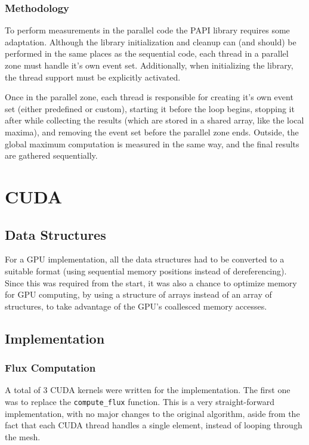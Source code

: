\documentclass[9pt,twocolumn]{scrartcl}
\begin{document}
\subsubsection{Methodology}%
To perform measurements in the parallel code the PAPI library requires some adaptation. Although the library initialization and cleanup can (and should) be performed in the same places as the sequential code, each thread in a parallel zone must handle it's own event set. Additionally, when initializing the library, the thread support must be explicitly activated.

Once in the parallel zone, each thread is responsible for creating it's own event set (either predefined or custom), starting it before the loop begins, stopping it after while collecting the results (which are stored in a shared array, like the local maxima), and removing the event set before the parallel zone ends. Outside, the global maximum computation is measured in the same way, and the final	 results are gathered sequentially.


\section{CUDA}
\label{sec:cuda}
\subsection{Data Structures}
For a GPU implementation, all the data structures had to be converted to a suitable format (using sequential memory positions instead of dereferencing). Since this was required from the start, it was also a chance to optimize memory for GPU computing, by using a structure of arrays instead of an array of structures, to take advantage of the GPU's coallesced memory accesses.

\subsection{Implementation}


\subsubsection{Flux Computation}
A total of 3 CUDA kernels were written for the implementation. The first one was to replace the \texttt{compute\_flux} function. This is a very straight-forward implementation, with no major changes to the original algorithm, aside from the fact that each CUDA thread handles a single element, instead of looping through the mesh.
\end{document}
